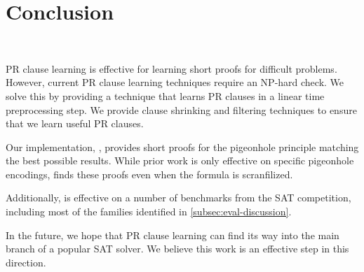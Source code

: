 \section{Conclusion}~\label{sec:conclusion}


PR clause learning is effective for learning short proofs for 
difficult problems. However, current PR clause learning techniques require
an NP-hard check. We solve this by providing a technique that learns PR clauses
in a linear time preprocessing step. We provide clause shrinking and filtering 
techniques to ensure that we learn useful PR clauses.

Our implementation, \tool, provides short \pr proofs for the pigeonhole principle matching the best possible results.
 While prior work is only effective on specific pigeonhole
encodings, \tool finds these proofs even when the formula is scranfilized.

Additionally, \tool is effective on a number of benchmarks from the SAT competition,
including most of the families identified in \autoref{subsec:eval-discussion}.

In the future, we hope that PR clause learning can find its way into the main branch
of a popular SAT solver. We believe this work is an effective step in this direction.

